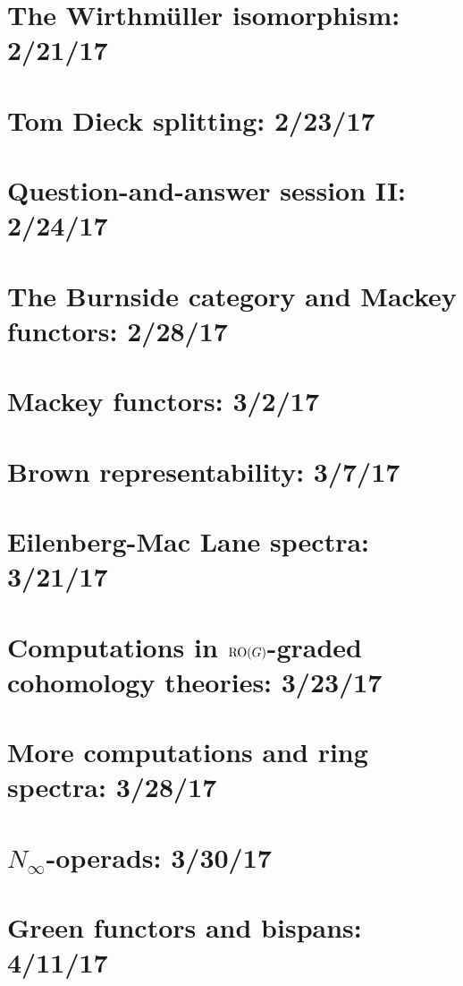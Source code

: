 \documentclass{style_EHT}
\begin{document}
\section{The Wirthmüller isomorphism: 2/21/17}
	
\section{Tom Dieck splitting: 2/23/17}
	
\section{Question-and-answer session II: 2/24/17}
	
\section{The Burnside category and Mackey functors: 2/28/17}
	
\section{Mackey functors: 3/2/17}
	
\section{Brown representability: 3/7/17}
	
\section{Eilenberg-Mac Lane spectra: 3/21/17}
	
\section{Computations in $\mathrm{RO}(G)$-graded cohomology theories: 3/23/17}
	
\section{More computations and ring spectra: 3/28/17}
	
\section{$N_\infty$-operads: 3/30/17}
	
\section{Green functors and bispans: 4/11/17}
	
\end{document}
